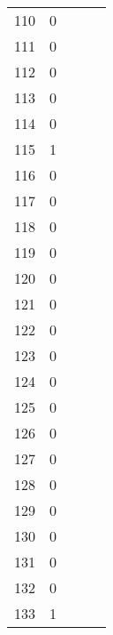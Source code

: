 \begin{center}
\begin{table}[H]
\begin{tabular}{ccccc}
\num{  110} & \num{    0} \\
\num{  111} & \num{    0} \\
\num{  112} & \num{    0} \\
\num{  113} & \num{    0} \\
\num{  114} & \num{    0} \\
\num{  115} & \num{    1} \\
\num{  116} & \num{    0} \\
\num{  117} & \num{    0} \\
\num{  118} & \num{    0} \\
\num{  119} & \num{    0} \\
\num{  120} & \num{    0} \\
\num{  121} & \num{    0} \\
\num{  122} & \num{    0} \\
\num{  123} & \num{    0} \\
\num{  124} & \num{    0} \\
\num{  125} & \num{    0} \\
\num{  126} & \num{    0} \\
\num{  127} & \num{    0} \\
\num{  128} & \num{    0} \\
\num{  129} & \num{    0} \\
\num{  130} & \num{    0} \\
\num{  131} & \num{    0} \\
\num{  132} & \num{    0} \\
\num{  133} & \num{    1} \\
\bottomrule
\end{tabular}
\end{table}
\end{center}
